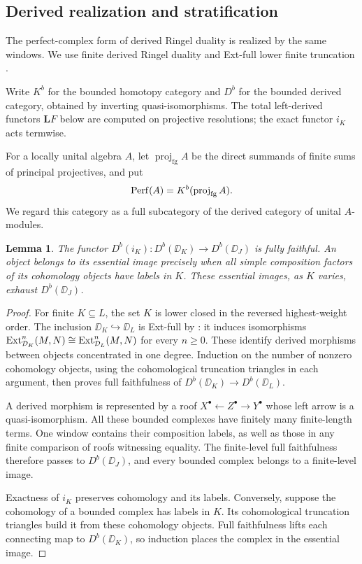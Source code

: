 \documentclass[11pt,reqno]{amsart}
\newtheorem{lemma}[theorem]{Lemma}
\theoremstyle{definition}
\theoremstyle{remark}
\numberwithin{equation}{section}
\begin{document}
\subsection{Derived realization and stratification}\label{sec:derived}

The perfect-complex form of derived Ringel duality
\cite[Section~2.4]{FG} is realized by the same windows. We use finite
derived Ringel duality and Ext-full lower finite truncation
\cite[Theorems~3.59 and~4.16]{BS}.

Write $K^b$ for the bounded homotopy category and $D^b$ for the
bounded derived category, obtained by inverting quasi-isomorphisms.
The total left-derived functors $\mathbf L F$ below are computed
on projective resolutions; the exact functor $i_K$ acts termwise.

For a locally unital algebra $A$, let
$\operatorname{proj}_{\mathrm{fg}}A$ be the direct summands of finite
sums of principal projectives, and put
\[
 \operatorname{Perf}(A)=K^b(\operatorname{proj}_{\mathrm{fg}}A).
\]
We regard this category as a full subcategory of the derived category
of unital $A$-modules.

\begin{lemma}\label{lem:dual-derived-windows}
The functor $D^b(i_K):D^b(\DD_K)\to D^b(\DD_J)$ is fully faithful.
An object belongs to its essential image precisely when all
simple composition factors of its cohomology objects have labels in $K$.
These essential images, as $K$ varies, exhaust $D^b(\DD_J)$.
\end{lemma}

\begin{proof}
For finite $K\subseteq L$, the set $K$ is lower closed in the reversed
highest-weight order. The inclusion $\DD_K\hookrightarrow\DD_L$ is
Ext-full by \cite[Theorem~3.59(5)]{BS}: it induces isomorphisms
$\operatorname{Ext}^n_{\mathcal D_K}(M,N)\cong\operatorname{Ext}^n_{\mathcal D_L}(M,N)$ for every $n\geq0$.
These identify derived morphisms between objects concentrated in one
degree. Induction on the number of nonzero cohomology objects, using
the cohomological truncation triangles in each argument, then proves
full faithfulness of $D^b(\DD_K)\to D^b(\DD_L)$.

A derived morphism is represented by a roof $X^\bullet\leftarrow
Z^\bullet\to Y^\bullet$ whose left arrow is a quasi-isomorphism.
All these bounded complexes have finitely many finite-length terms.
One window contains their composition labels, as well as those in
any finite comparison of roofs witnessing equality. The finite-level
full faithfulness therefore passes to $D^b(\DD_J)$, and every bounded
complex belongs to a finite-level image.

Exactness of $i_K$ preserves cohomology and its labels. Conversely,
suppose the cohomology of a bounded complex has labels in $K$.
Its cohomological truncation triangles build it from these cohomology
objects. Full faithfulness lifts each connecting map to $D^b(\DD_K)$,
so induction places the complex in the essential image.
\end{proof}
\end{document}
